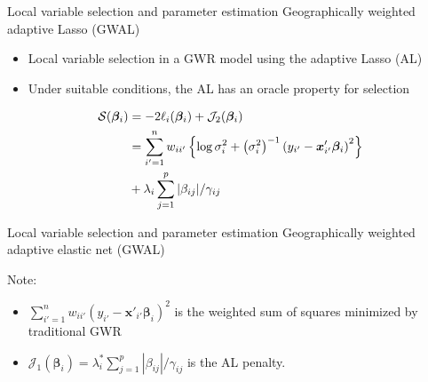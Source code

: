 \documentclass[12pt,t]{beamer}
\newcommand{\subt}[1]{{\footnotesize \color{subtitle} {#1}}}
\begin{document}
\begin{frame}{Local variable selection and  parameter estimation}
\subt{Geographically weighted adaptive Lasso (GWAL)}

\bigskip
\begin{itemize}
    \item Local variable selection in a GWR model using the adaptive Lasso (AL) \citep{Zou:2006}
    \item Under suitable conditions, the AL has an oracle property for selection
\end{itemize}
\begin{align}
		\mathcal{S}(\bm{\beta}_i) &= -2 \ell_i(\bm{\beta}_i) + \mathcal{J}_2(\bm{\beta}_i) \notag \\
		&= \sum_{i'=1}^n w_{ii'}  \left\{ \log{\sigma^2_i}  + \left(\sigma^2_i\right)^{-1}  \left(y_{i'} - \bm{x}'_{i'} \bm{\beta}_i \right)^2 \right\}   \notag \\
		&+ \lambda_i \sum_{j=1}^p |\beta_{ij}| / \gamma_{ij} \notag
\end{align}

\end{frame}




\begin{frame}{Local variable selection and  parameter estimation}
\subt{Geographically weighted adaptive elastic net (GWAL)}

\bigskip
Note:
\begin{itemize}
  \item $\sum_{i'=1}^n w_{ii'} \left(y_{i'} - \bm{x}'_{i'} \bm{\beta}_i \right)^2$ is the weighted sum of squares minimized by traditional GWR
  \item $\mathcal{J}_1(\bm{\beta}_i) = \lambda^*_i \sum_{j=1}^p |\beta_{ij}| / \gamma_{ij}$ is the AL penalty.
\end{itemize}

\end{frame}
\end{document}
